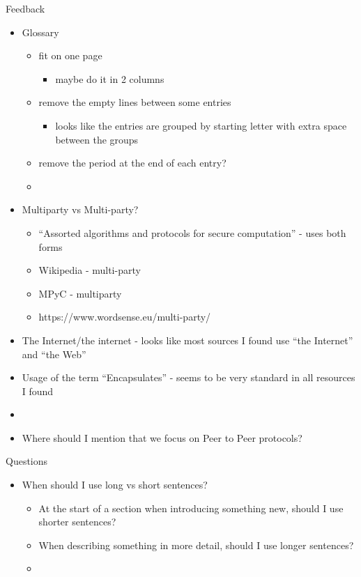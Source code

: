 \begin{frame}{Feedback}
\protect\hypertarget{feedback}{}
\begin{itemize}
\tightlist
\item
  Glossary

  \begin{itemize}
  \tightlist
  \item
    fit on one page

    \begin{itemize}
    \tightlist
    \item
      maybe do it in 2 columns
    \end{itemize}
  \item
    remove the empty lines between some entries

    \begin{itemize}
    \tightlist
    \item
      looks like the entries are grouped by starting letter with extra
      space between the groups
    \end{itemize}
  \item
    remove the period at the end of each entry?
  \item
  \end{itemize}
\item
  Multiparty vs Multi-party?

  \begin{itemize}
  \tightlist
  \item
    ``Assorted algorithms and protocols for secure computation'' - uses
    both forms
  \item
    Wikipedia - multi-party
  \item
    MPyC - multiparty
  \item
    https://www.wordsense.eu/multi-party/
  \end{itemize}
\item
  The Internet/the internet - looks like most sources I found use ``the
  Internet'' and ``the Web''
\item
  Usage of the term ``Encapsulates'' - seems to be very standard in all
  resources I found
\item
\item
  Where should I mention that we focus on Peer to Peer protocols?
\end{itemize}
\end{frame}

\begin{frame}{Questions}
\protect\hypertarget{questions}{}
\begin{itemize}
\tightlist
\item
  When should I use long vs short sentences?

  \begin{itemize}
  \tightlist
  \item
    At the start of a section when introducing something new, should I
    use shorter sentences?
  \item
    When describing something in more detail, should I use longer
    sentences?
  \item
  \end{itemize}
\end{itemize}
\end{frame}

